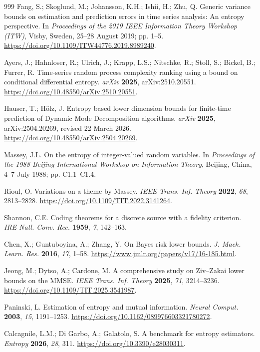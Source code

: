 \begin{thebibliography}{999}
Fang, S.; Skoglund, M.; Johansson, K.H.; Ishii, H.; Zhu, Q. Generic variance bounds on estimation and prediction errors in time series analysis: An entropy perspective. In \emph{Proceedings of the 2019 IEEE Information Theory Workshop (ITW)}, Visby, Sweden, 25--28 August 2019; pp. 1--5. \url{https://doi.org/10.1109/ITW44776.2019.8989240}.

Ayers, J.; Hahnloser, R.; Ulrich, J.; Krapp, L.S.; Nitschke, R.; Stoll, S.; Bickel, B.; Furrer, R. Time-series random process complexity ranking using a bound on conditional differential entropy. \emph{arXiv} \textbf{2025}, arXiv:2510.20551. \url{https://doi.org/10.48550/arXiv.2510.20551}.

Hauser, T.; H\"olz, J. Entropy based lower dimension bounds for finite-time prediction of Dynamic Mode Decomposition algorithms. \emph{arXiv} \textbf{2025}, arXiv:2504.20269, revised 22 March 2026. \url{https://doi.org/10.48550/arXiv.2504.20269}.

Massey, J.L. On the entropy of integer-valued random variables. In \emph{Proceedings of the 1988 Beijing International Workshop on Information Theory}, Beijing, China, 4--7 July 1988; pp. C1.1--C1.4.

Rioul, O. Variations on a theme by Massey. \emph{IEEE Trans. Inf. Theory} \textbf{2022}, \emph{68}, 2813--2828. \url{https://doi.org/10.1109/TIT.2022.3141264}.

Shannon, C.E. Coding theorems for a discrete source with a fidelity criterion. \emph{IRE Natl. Conv. Rec.} \textbf{1959}, \emph{7}, 142--163.

Chen, X.; Guntuboyina, A.; Zhang, Y. On Bayes risk lower bounds. \emph{J. Mach. Learn. Res.} \textbf{2016}, \emph{17}, 1--58. \url{https://www.jmlr.org/papers/v17/16-185.html}.

Jeong, M.; Dytso, A.; Cardone, M. A comprehensive study on Ziv--Zakai lower bounds on the MMSE. \emph{IEEE Trans. Inf. Theory} \textbf{2025}, \emph{71}, 3214--3236. \url{https://doi.org/10.1109/TIT.2025.3541987}.

Paninski, L. Estimation of entropy and mutual information. \emph{Neural Comput.} \textbf{2003}, \emph{15}, 1191--1253. \url{https://doi.org/10.1162/089976603321780272}.

Calcagnile, L.M.; Di Garbo, A.; Galatolo, S. A benchmark for entropy estimators. \emph{Entropy} \textbf{2026}, \emph{28}, 311. \url{https://doi.org/10.3390/e28030311}.


\end{thebibliography}

